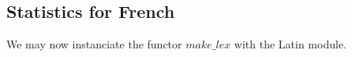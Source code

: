 \subsection{Statistics for French}

We may now instanciate the functor $make\_lex$ with the Latin module.





